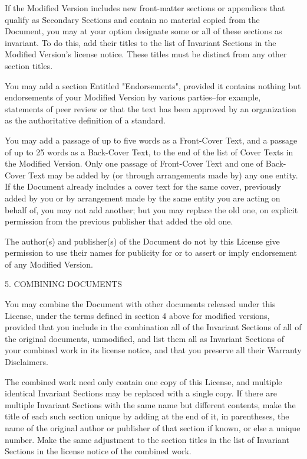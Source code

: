 \documentclass[oneside,english,a4paper,10pt,oneside,openany,final]{memoir}
\begin{document}
If the Modified Version includes new front-matter sections or appendices that qualify as Secondary Sections and contain no material copied from the Document, you may at your option designate some or all of these sections as invariant. To do this, add their titles to the list of Invariant Sections in the Modified Version's license notice. These titles must be distinct from any other section titles.

You may add a section Entitled "Endorsements", provided it contains nothing but endorsements of your Modified Version by various parties--for example, statements of peer review or that the text has been approved by an organization as the authoritative definition of a standard.

You may add a passage of up to five words as a Front-Cover Text, and a passage of up to 25 words as a Back-Cover Text, to the end of the list of Cover Texts in the Modified Version. Only one passage of Front-Cover Text and one of Back-Cover Text may be added by (or through arrangements made by) any one entity. If the Document already includes a cover text for the same cover, previously added by you or by arrangement made by the same entity you are acting on behalf of, you may not add another; but you may replace the old one, on explicit permission from the previous publisher that added the old one.

The author(s) and publisher(s) of the Document do not by this License give permission to use their names for publicity for or to assert or imply endorsement of any Modified Version.

5. COMBINING DOCUMENTS

You may combine the Document with other documents released under this License, under the terms defined in section 4 above for modified versions, provided that you include in the combination all of the Invariant Sections of all of the original documents, unmodified, and list them all as Invariant Sections of your combined work in its license notice, and that you preserve all their Warranty Disclaimers.

The combined work need only contain one copy of this License, and multiple identical Invariant Sections may be replaced with a single copy. If there are multiple Invariant Sections with the same name but different contents, make the title of each such section unique by adding at the end of it, in parentheses, the name of the original author or publisher of that section if known, or else a unique number. Make the same adjustment to the section titles in the list of Invariant Sections in the license notice of the combined work.
\end{document}
